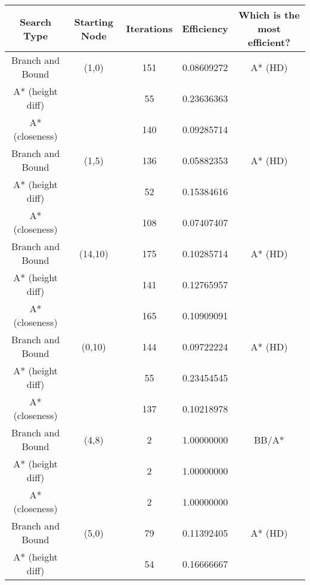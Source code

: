 \documentclass[11pt,oneside]{article}
\begin{document}
\begin{table}[!ht]
    \centering
    \begin{tabular}{|c|c|c|c|c|}
        Search Type & Starting Node & Iterations & Efficiency & Which is the most efficient?  \\ \hline
        Branch and Bound & (1,0)         & 151        & 0.08609272 & A* (HD)                  \\
        A* (height diff) &               & 55         & 0.23636363 &                          \\
        A* (closeness)   &               & 140        & 0.09285714 &                          \\
        Branch and Bound & (1,5)         & 136        & 0.05882353 & A* (HD)                  \\
        A* (height diff) &               & 52         & 0.15384616 &                          \\
        A* (closeness)   &               & 108        & 0.07407407 &                          \\
        Branch and Bound & (14,10)       & 175        & 0.10285714 & A* (HD)                  \\
        A* (height diff) &               & 141        & 0.12765957 &                          \\
        A* (closeness)   &               & 165        & 0.10909091 &                          \\
        Branch and Bound & (0,10)        & 144        & 0.09722224 & A* (HD)                  \\
        A* (height diff) &               & 55         & 0.23454545 &                          \\
        A* (closeness)   &               & 137        & 0.10218978 &                          \\
        Branch and Bound & (4,8)         & 2          & 1.00000000 & BB/A*                    \\
        A* (height diff) &               & 2          & 1.00000000 &                          \\
        A* (closeness)   &               & 2          & 1.00000000 &                          \\
        Branch and Bound & (5,0)         & 79         & 0.11392405 & A* (HD)                  \\
        A* (height diff) &               & 54         & 0.16666667 &                          \\

\end{tabular}
\end{table}
\end{document}
